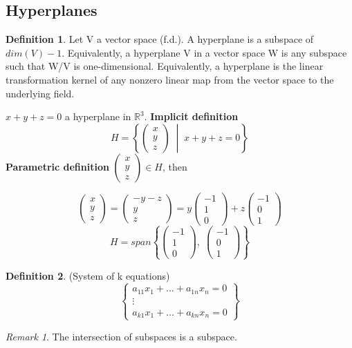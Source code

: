 \documentclass[12pt]{article}
\theoremstyle{definition}
\newtheorem{definition}{Definition}[section]
\theoremstyle{remark}
\newtheorem*{remark}{Remark}
\begin{document}
\subsection{Hyperplanes}
\begin{definition}
    Let V a vector space (f.d.). A hyperplane is a subspace of $dim(V)-1$. Equivalently, a hyperplane V in a vector 
    space W is any subspace such that W/V is one-dimensional. Equivalently, a hyperplane is the linear 
    transformation kernel of any nonzero linear map from the vector space to the underlying field.
\end{definition}
\begin{example}
    $x+y+z = 0$ a hyperplane in $\mathbb{R}^3$. 
    \newline
    \textbf{Implicit definition}
    $$H = \left\{ \begin{pmatrix} x\\y\\z \end{pmatrix} \;\middle| \; x+y+z = 0 \right\}$$
    \textbf{Parametric definition}
    \newline 
    $\begin{pmatrix} x\\y\\z \end{pmatrix} \in H$, then 
   
    $$\begin{pmatrix} x\\y\\z \end{pmatrix} = \begin{pmatrix} -y-z\\y\\z \end{pmatrix} = y\begin{pmatrix} -1\\1\\0 \end{pmatrix}+z \begin{pmatrix} -1\\0\\1 \end{pmatrix}$$
    $$H = span \left\{ \begin{pmatrix} -1\\1\\0 \end{pmatrix}, \; \begin{pmatrix} -1\\0\\1 \end{pmatrix} \right\}$$
\end{example}
\begin{definition}(System of k equations)
    $$\left\{\begin{matrix} a_{11}x_1 + \hdots + a_{1n}x_n = 0 \\ \vdots \\a_{k1}x_1 + \hdots + a_{kn}x_n = 0 \end{matrix} \right\}$$
\end{definition}
\begin{remark}
    The intersection of subspaces is a subspace.
\end{remark}
\end{document}
